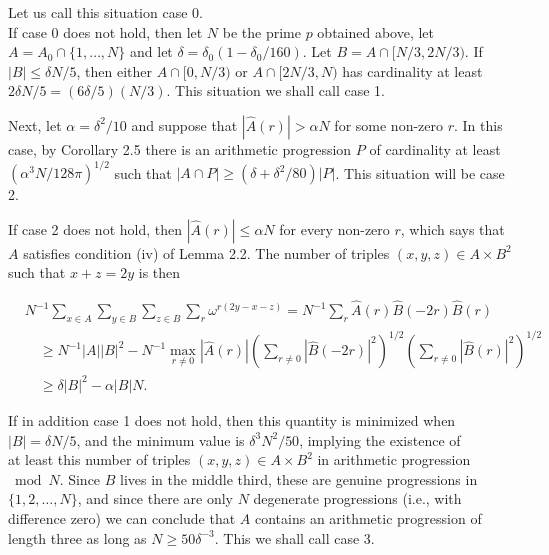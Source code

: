 \documentclass[10pt]{article}
\begin{document}
Let us call this situation case 0.\\
If case 0 does not hold, then let $N$ be the prime $p$ obtained above, let $A=A_{0} \cap\{1, \ldots, N\}$ and let $\delta=\delta_{0}\left(1-\delta_{0} / 160\right)$. Let $B=A \cap[N / 3,2 N / 3)$. If $|B| \leqslant \delta N / 5$, then either $A \cap[0, N / 3)$ or $A \cap[2 N / 3, N)$ has cardinality at least $2 \delta N / 5=(6 \delta / 5)(N / 3)$. This situation we shall call case 1.

Next, let $\alpha=\delta^{2} / 10$ and suppose that $|\hat{A}(r)|>\alpha N$ for some non-zero $r$. In this case, by Corollary 2.5 there is an arithmetic progression $P$ of cardinality at least $\left(\alpha^{3} N / 128 \pi\right)^{1 / 2}$ such that $|A \cap P| \geqslant\left(\delta+\delta^{2} / 80\right)|P|$. This situation will be case 2.

If case 2 does not hold, then $|\hat{A}(r)| \leqslant \alpha N$ for every non-zero $r$, which says that $A$ satisfies condition (iv) of Lemma 2.2. The number of triples $(x, y, z) \in A \times B^{2}$ such that $x+z=2 y$ is then

$$
\begin{aligned}
& N^{-1} \sum_{x \in A} \sum_{y \in B} \sum_{z \in B} \sum_{r} \omega^{r(2 y-x-z)}=N^{-1} \sum_{r} \hat{A}(r) \hat{B}(-2 r) \hat{B}(r) \\
& \quad \geqslant N^{-1}|A||B|^{2}-N^{-1} \max _{r \neq 0}|\hat{A}(r)|\left(\sum_{r \neq 0}|\hat{B}(-2 r)|^{2}\right)^{1 / 2}\left(\sum_{r \neq 0}|\hat{B}(r)|^{2}\right)^{1 / 2} \\
& \quad \geqslant \delta|B|^{2}-\alpha|B| N .
\end{aligned}
$$

If in addition case 1 does not hold, then this quantity is minimized when $|B|=\delta N / 5$, and the minimum value is $\delta^{3} N^{2} / 50$, implying the existence of\\
at least this number of triples $(x, y, z) \in A \times B^{2}$ in arithmetic progression $\bmod N$. Since $B$ lives in the middle third, these are genuine progressions in $\{1,2, \ldots, N\}$, and since there are only $N$ degenerate progressions (i.e., with difference zero) we can conclude that $A$ contains an arithmetic progression of length three as long as $N \geqslant 50 \delta^{-3}$. This we shall call case 3.
\end{document}
